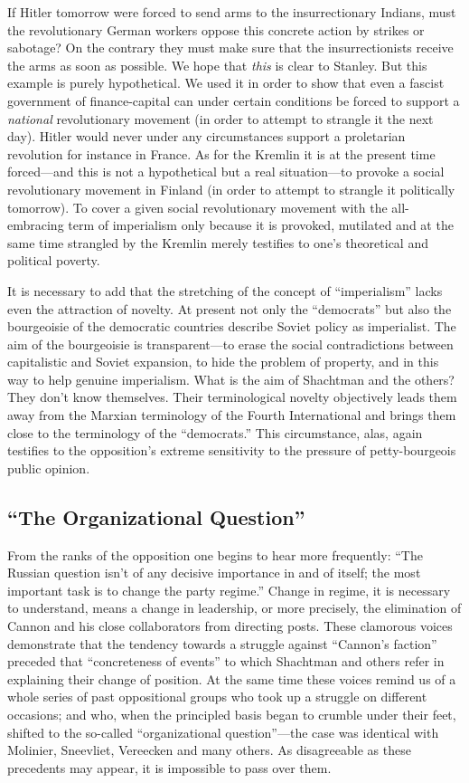 If Hitler tomorrow were forced to send arms to the insurrectionary Indians, must the revolutionary German workers oppose this concrete action by strikes or sabotage? On the contrary they must make sure that the insurrectionists receive the arms as soon as possible. We hope that \emph{this} is clear to Stanley. But this example is purely hypothetical. We used it in order to show that even a fascist government of finance-capital can under certain conditions be forced to support a \emph{national} revolutionary movement (in order to attempt to strangle it the next day). Hitler would never under any circumstances support a proletarian revolution for instance in France. As for the Kremlin it is at the present time forced---and this is not a hypothetical but a real situation---to provoke a social revolutionary movement in Finland (in order to attempt to strangle it politically tomorrow). To cover a given social revolutionary movement with the all-embracing term of imperialism only because it is provoked, mutilated and at the same time strangled by the Kremlin merely testifies to one’s theoretical and political poverty.

It is necessary to add that the stretching of the concept of “imperialism” lacks even the attraction of novelty. At present not only the “democrats” but also the bourgeoisie of the democratic countries describe Soviet policy as imperialist. The aim of the bourgeoisie is transparent---to erase the social contradictions between capitalistic and Soviet expansion, to hide the problem of property, and in this way to help genuine imperialism. What is the aim of Shachtman and the others? They don’t know themselves. Their terminological novelty objectively leads them away from the Marxian terminology of the Fourth International and brings them close to the terminology of the “democrats.” This circumstance, alas, again testifies to the opposition’s extreme sensitivity to the pressure of petty-bourgeois public opinion.

\subsection*{“The Organizational Question”}

From the ranks of the opposition one begins to hear more frequently: “The Russian question isn’t of any decisive importance in and of itself; the most important task is to change the party regime.” Change in regime, it is necessary to understand, means a change in leadership, or more precisely, the elimination of Cannon and his close collaborators from directing posts. These clamorous voices demonstrate that the tendency towards a struggle against “Cannon’s faction” preceded that “concreteness of events” to which Shachtman and others refer in explaining their change of position. At the same time these voices remind us of a whole series of past oppositional groups who took up a struggle on different occasions; and who, when the principled basis began to crumble under their feet, shifted to the so-called “organizational question”---the case was identical with Molinier, Sneevliet, Vereecken and many others. As disagreeable as these precedents may appear, it is impossible to pass over them.

